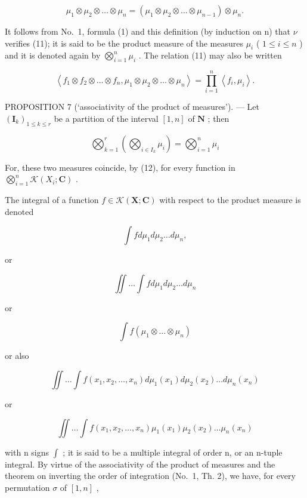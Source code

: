 \[
\mu_ {1} \otimes \mu_ {2} \otimes \dots \otimes \mu_ {n} = (\mu_ {1} \otimes \mu_ {2} \otimes \dots \otimes \mu_ {n - 1}) \otimes \mu_ {n}.
\]

It follows from No.~1, formula (1) and this definition (by induction on n) that \(\nu\) verifies (11); it is said to be the product measure of the measures \(\mu_{i}\) ( \(1 \leqslant i \leqslant n\) ) and it is denoted again by \(\bigotimes_{i=1}^{n} \mu_{i}\) . The relation (11) may also be written

\[
\left\langle f _ {1} \otimes f _ {2} \otimes \dots \otimes f _ {n}, \mu_ {1} \otimes \mu_ {2} \otimes \dots \otimes \mu_ {n} \right\rangle = \prod_ {i = 1} ^ {n} \left\langle f _ {i}, \mu_ {i} \right\rangle .\tag{12}
\]

PROPOSITION 7 (`associativity of the product of measures'). --- Let \((\mathbf{I}_k)_{1 \leqslant k \leqslant r}\) be a partition of the interval \([1, n]\) of \(\mathbf{N}\) ; then

\[
\bigotimes_ {k = 1} ^ {r} \left(\bigotimes_ {i \in I _ {k}} \mu_ {i}\right) = \bigotimes_ {i = 1} ^ {n} \mu_ {i}\tag{13}
\]

For, these two measures coincide, by (12), for every function in \(\bigotimes_ {i = 1} ^ {n} \mathcal{K}(X_{i}; \mathbf{C})\) .

The integral of a function \(f \in \mathcal{K}(\mathbf{X};\mathbf{C})\) with respect to the product measure is denoted

\[
\int f d \mu_ {1} d \mu_ {2} \dots d \mu_ {n},
\]

or

\[
\iint \ldots \int f d \mu_ {1} d \mu_ {2} \ldots d \mu_ {n}
\]

or

\[
\int f (\mu_ {1} \otimes \dots \otimes \mu_ {n})
\]

or also

\[
\iint \dots \int f (x _ {1}, x _ {2}, \dots , x _ {n}) d \mu_ {1} (x _ {1}) d \mu_ {2} (x _ {2}) \dots d \mu_ {n} (x _ {n})
\]

or

\[
\iint \dots \int f (x _ {1}, x _ {2}, \dots , x _ {n}) \mu_ {1} (x _ {1}) \mu_ {2} (x _ {2}) \dots \mu_ {n} (x _ {n})
\]

with n signs \(\int\) ; it is said to be a multiple integral of order n, or an n-tuple integral. By virtue of the associativity of the product of measures and the theorem on inverting the order of integration (No.~1, Th. 2), we have, for every permutation \(\sigma\) of \([1,n]\) ,

